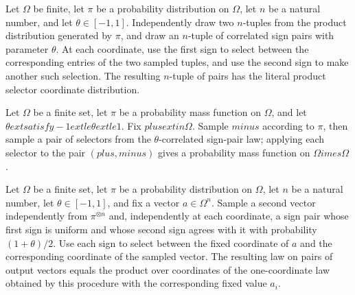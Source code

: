 \begin{definition}
\label{FABL.literalProductSelectorCoordinatePMF}
\leanok
{}
Let $\Omega$ be finite, let $\pi$ be a probability distribution on $\Omega$, let $n$ be
a natural number, and let $\theta\in[-1,1]$. Independently draw two $n$-tuples from the
product distribution generated by $\pi$, and draw an $n$-tuple of correlated sign pairs
with parameter $\theta$. At each coordinate, use the first sign to select between the
corresponding entries of the two sampled tuples, and use the second sign to make another
such selection. The resulting $n$-tuple of pairs has the literal product selector
coordinate distribution.
\end{definition}

\begin{definition}
\label{FABL.selectorGivenPlusCoordinatePMF}
\leanok
{}
Let $Ω$ be a finite set, let $π$ be a probability mass function on $Ω$, and let
$θ	ext{ satisfy }-1	ext{le}θ	ext{le}1$. Fix $plus	ext{in}Ω$. Sample $minus$
according to $π$, then sample a pair of selectors from the $θ$-correlated sign-pair
law; applying each selector to the pair $(plus,minus)$ gives a probability mass
function on $Ω	imesΩ$.
\end{definition}

\begin{theorem}
\label{FABL.literalSelector_after_plus}
\leanok
{}
Let $\Omega$ be a finite set, let $\pi$ be a probability distribution on $\Omega$, let
$n$ be a natural number, let $\theta\in[-1,1]$, and fix a vector $a\in\Omega^n$. Sample
a second vector independently from $\pi^{\otimes n}$ and, independently at each
coordinate, a sign pair whose first sign is uniform and whose second sign agrees with it
with probability $(1+\theta)/2$. Use each sign to select between the fixed coordinate of
$a$ and the corresponding coordinate of the sampled vector. The resulting law on pairs
of output vectors equals the product over coordinates of the one-coordinate law obtained
by this procedure with the corresponding fixed value $a_i$.
\end{theorem}

